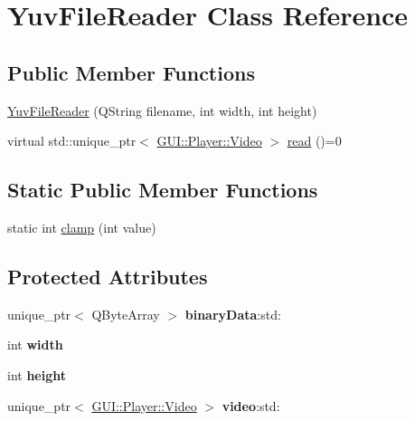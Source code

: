 \hypertarget{classGUI_1_1Player_1_1YuvFileReader}{}\section{Yuv\+File\+Reader Class Reference}
\label{classGUI_1_1Player_1_1YuvFileReader}
\subsection*{Public Member Functions}
\begin{DoxyCompactItemize}
\item 
\hyperlink{classGUI_1_1Player_1_1YuvFileReader_a4d1117a96eef85d154a837df5779e21a}{Yuv\+File\+Reader} (Q\+String filename, int width, int height)
\item 
virtual std\+::unique\+\_\+ptr$<$ \hyperlink{classGUI_1_1Player_1_1Video}{G\+U\+I\+::\+Player\+::\+Video} $>$ \hyperlink{classGUI_1_1Player_1_1YuvFileReader_a9e149e2cb193ef5ed20d0d38f42d2751}{read} ()=0
\end{DoxyCompactItemize}
\subsection*{Static Public Member Functions}
\begin{DoxyCompactItemize}
\item 
static int \hyperlink{classGUI_1_1Player_1_1YuvFileReader_ae73346d00388350396fd2185ca80dfb8}{clamp} (int value)
\end{DoxyCompactItemize}
\subsection*{Protected Attributes}
\begin{DoxyCompactItemize}
\item 
\hypertarget{classGUI_1_1Player_1_1YuvFileReader_aa6f0d985e2603aa538ffa615b26c0b4d}{}unique\+\_\+ptr$<$ Q\+Byte\+Array $>$ {\bfseries binary\+Data}\+:std\+:\label{classGUI_1_1Player_1_1YuvFileReader_aa6f0d985e2603aa538ffa615b26c0b4d}

\item 
\hypertarget{classGUI_1_1Player_1_1YuvFileReader_a2474a5474cbff19523a51eb1de01cda4}{}int {\bfseries width}\label{classGUI_1_1Player_1_1YuvFileReader_a2474a5474cbff19523a51eb1de01cda4}

\item 
\hypertarget{classGUI_1_1Player_1_1YuvFileReader_ad12fc34ce789bce6c8a05d8a17138534}{}int {\bfseries height}\label{classGUI_1_1Player_1_1YuvFileReader_ad12fc34ce789bce6c8a05d8a17138534}

\item 
\hypertarget{classGUI_1_1Player_1_1YuvFileReader_a116c92e009352d894f8d0f608109ebe9}{}unique\+\_\+ptr$<$ \hyperlink{classGUI_1_1Player_1_1Video}{G\+U\+I\+::\+Player\+::\+Video} $>$ {\bfseries video}\+:std\+:\label{classGUI_1_1Player_1_1YuvFileReader_a116c92e009352d894f8d0f608109ebe9}

\end{DoxyCompactItemize}


